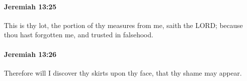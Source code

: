 		\paragraph{Jeremiah 13:25} %
			\label{JEREMIAH-13-25}

			This is thy lot, the portion of thy measures from me, saith the LORD; because thou hast forgotten me, and trusted in falsehood.


		\paragraph{Jeremiah 13:26} %
			\label{JEREMIAH-13-26}

			Therefore will I discover thy skirts upon thy face, that thy shame may appear.


